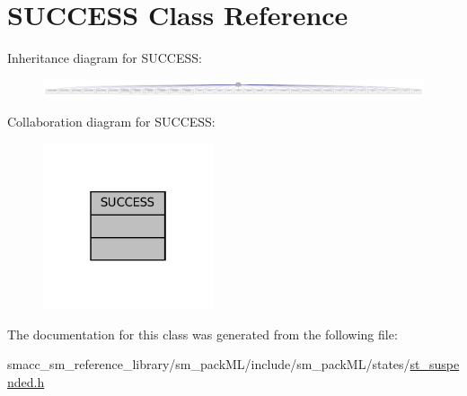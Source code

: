 \hypertarget{classSUCCESS}{}\section{S\+U\+C\+C\+E\+SS Class Reference}
\label{classSUCCESS}


Inheritance diagram for S\+U\+C\+C\+E\+SS\+:
\nopagebreak
\begin{figure}[H]
\begin{center}
\leavevmode
\includegraphics[width=350pt]{classSUCCESS__inherit__graph}
\end{center}
\end{figure}


Collaboration diagram for S\+U\+C\+C\+E\+SS\+:
\nopagebreak
\begin{figure}[H]
\begin{center}
\leavevmode
\includegraphics[width=142pt]{classSUCCESS__coll__graph}
\end{center}
\end{figure}


The documentation for this class was generated from the following file\+:\begin{DoxyCompactItemize}
\item 
smacc\+\_\+sm\+\_\+reference\+\_\+library/sm\+\_\+pack\+M\+L/include/sm\+\_\+pack\+M\+L/states/\hyperlink{st__suspended_8h}{st\+\_\+suspended.\+h}\end{DoxyCompactItemize}
